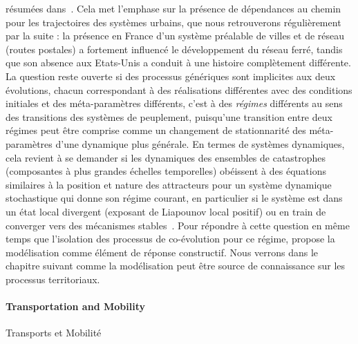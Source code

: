 {résumées dans~\cite{bretagnolle2010comparer}. Cela met l'emphase sur la présence de dépendances au chemin pour les trajectoires des systèmes urbains, que nous retrouverons régulièrement par la suite : la présence en France d'un système préalable de villes et de réseau (routes postales) a fortement influencé le développement du réseau ferré, tandis que son absence aux Etats-Unis a conduit à une histoire complètement différente. La question reste ouverte si  des processus génériques sont implicites aux deux évolutions, chacun correspondant à des réalisations différentes avec des conditions initiales et des méta-paramètres différents, c'est à des \emph{régimes} différents au sens des transitions des systèmes de peuplement, puisqu'une transition entre deux régimes peut être comprise comme un changement de stationnarité des méta-paramètres d'une dynamique plus générale. En termes de systèmes dynamiques, cela revient à se demander si les dynamiques des ensembles de catastrophes (composantes à plus grandes échelles temporelles) obéissent à des équations similaires à la position et nature des attracteurs pour un système dynamique stochastique qui donne son régime courant, en particulier si le système est dans un état local divergent (exposant de Liapounov local positif) ou en train de converger vers des mécanismes stables~\cite{sanders1992systeme}. Pour répondre à cette question en même temps que l'isolation des processus de co-évolution pour ce régime, \cite{bretagnolle:tel-00459720} propose la modélisation comme élément de réponse constructif. Nous verrons dans le chapitre suivant comme la modélisation peut être source de connaissance sur les processus territoriaux. 
}



\paragraph{Transportation and Mobility}{Transports et Mobilité}


